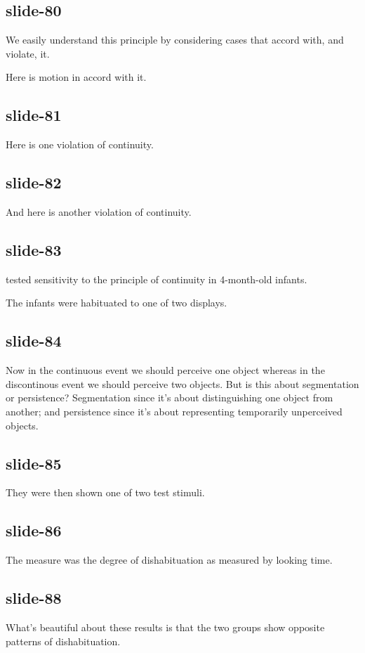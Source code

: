 \documentclass[12pt,\papersize]{extarticle}
\begin{document}
\subsection{slide-80}
We easily understand this principle by considering cases that accord with, and violate, it.
 
Here is motion in accord with it.
 
\subsection{slide-81}
Here is one violation of continuity.
 
\subsection{slide-82}
And here is another violation of continuity.
 
\subsection{slide-83}
\citet{spelke:1995_spatiotemporal} tested sensitivity to the principle of continuity in 4-month-old infants.
 
The infants were habituated to one of two displays.
 
\subsection{slide-84}
Now in the continuous event we should perceive one object whereas in the
discontinous event we should perceive two objects. But is this about
segmentation or persistence? Segmentation since it's about distinguishing
one object from another; and persistence since it's about representing
temporarily unperceived objects.
 
\subsection{slide-85}
They were then shown one of two test stimuli.
 
\subsection{slide-86}
The measure was the degree of dishabituation as measured by looking time.
 
\subsection{slide-88}
What's beautiful about these results is that the two groups show opposite patterns of dishabituation.
 
\end{document}
